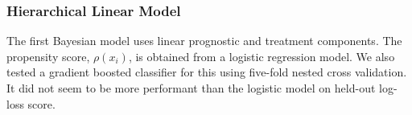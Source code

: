 \documentclass[12pt, a4paper]{article}
\begin{document}
\subsubsection*{Hierarchical Linear Model}

The first Bayesian model uses linear prognostic and treatment components. The propensity score, $\rho(x_i)$, is obtained from a logistic regression model. We also tested a gradient boosted classifier
\citep{friedman2001} for this using five-fold nested cross validation.  It did not seem to be more performant than the logistic model on held-out log-loss score.
 
\end{document}
